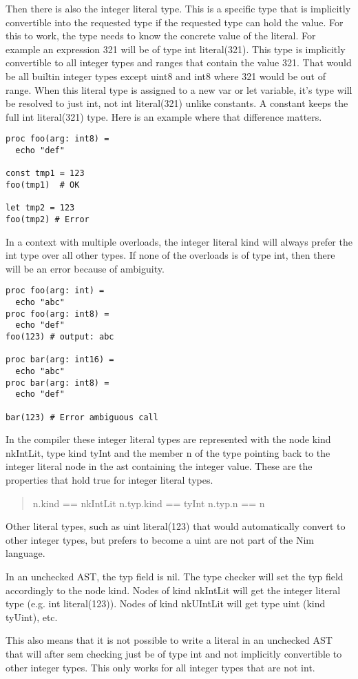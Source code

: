 Then there is also the integer literal type. This is a specific type
that is implicitly convertible into the requested type if the requested
type can hold the value. For this to work, the type needs to know the
concrete value of the literal. For example an expression {321} will be
of type {int literal(321)}. This type is implicitly convertible to all
integer types and ranges that contain the value {321}. That would be all
builtin integer types except {uint8} and {int8} where {321} would be out
of range. When this literal type is assigned to a new {var} or {let}
variable, it's type will be resolved to just {int}, not {int
literal(321)} unlike constants. A constant keeps the full {int
literal(321)} type. Here is an example where that difference matters.

\begin{verbatim}
proc foo(arg: int8) =
  echo "def"

const tmp1 = 123
foo(tmp1)  # OK

let tmp2 = 123
foo(tmp2) # Error
\end{verbatim}

In a context with multiple overloads, the integer literal kind will
always prefer the {int} type over all other types. If none of the
overloads is of type {int}, then there will be an error because of
ambiguity.

\begin{verbatim}
proc foo(arg: int) =
  echo "abc"
proc foo(arg: int8) =
  echo "def"
foo(123) # output: abc

proc bar(arg: int16) =
  echo "abc"
proc bar(arg: int8) =
  echo "def"

bar(123) # Error ambiguous call
\end{verbatim}

In the compiler these integer literal types are represented with the
node kind {nkIntLit}, type kind {tyInt} and the member {n} of the type
pointing back to the integer literal node in the ast containing the
integer value. These are the properties that hold true for integer
literal types.

\begin{quote}
n.kind == nkIntLit n.typ.kind == tyInt n.typ.n == n
\end{quote}

Other literal types, such as {uint literal(123)} that would
automatically convert to other integer types, but prefers to become a
{uint} are not part of the Nim language.

In an unchecked AST, the {typ} field is nil. The type checker will set
the {typ} field accordingly to the node kind. Nodes of kind {nkIntLit}
will get the integer literal type (e.g. {int literal(123)}). Nodes of
kind {nkUIntLit} will get type {uint} (kind {tyUint}), etc.

This also means that it is not possible to write a literal in an
unchecked AST that will after sem checking just be of type {int} and not
implicitly convertible to other integer types. This only works for all
integer types that are not {int}.
